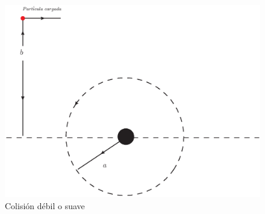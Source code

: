 \begin{figure}[htbp]
   \centering
   \includegraphics[width=.65\linewidth]{./Figures/softcoli.eps}
   \caption{Colisión débil o suave}
   \label{fig:UoC}
\end{figure}
